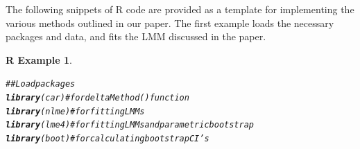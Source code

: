 \documentclass{article}\usepackage[]{graphicx}\usepackage[]{color}
\makeatletter
\newcommand{\hlcom}[1]{\textcolor[rgb]{0.678,0.584,0.686}{\textit{#1}}}%
\newcommand{\hlstd}[1]{\textcolor[rgb]{0.345,0.345,0.345}{#1}}%
\newcommand{\hlkwd}[1]{\textcolor[rgb]{0.737,0.353,0.396}{\textbf{#1}}}%
\newenvironment{kframe}{%
 \def\at@end@of@kframe{}%
 \ifinner\ifhmode%
  \def\at@end@of@kframe{\end{minipage}}%
  \begin{minipage}{\columnwidth}%
 \fi\fi%
 \def\FrameCommand##1{\hskip\@totalleftmargin \hskip-\fboxsep
 \colorbox{shadecolor}{##1}\hskip-\fboxsep
     \hskip-\linewidth \hskip-\@totalleftmargin \hskip\columnwidth}%
 \MakeFramed {\advance\hsize-\width
   \@totalleftmargin\z@ \linewidth\hsize
   \@setminipage}}%
 {\par\unskip\endMakeFramed%
 \at@end@of@kframe}
\newenvironment{knitrout}{}{} %
\newcommand{\proglang}[1]{\textsf{#1}}
\newtheorem{rexample}{R Example}%
\makeatother
\begin{document}
The following snippets of \proglang{R} code are provided as a template for implementing the various methods outlined in our paper. The first example loads the necessary packages and data, and fits the LMM discussed in the paper.
\begin{knitrout}
\color{fgcolor}\begin{kframe}
\begin{rexample}\label{example-1}\hfill{}\begin{alltt}
\hlcom{## Load packages}
\hlkwd{library}\hlstd{(car)}  \hlcom{# for deltaMethod() function}
\hlkwd{library}\hlstd{(nlme)}  \hlcom{# for fitting LMMs}
\hlkwd{library}\hlstd{(lme4)}  \hlcom{# for fitting LMMs and parametric bootstrap}
\hlkwd{library}\hlstd{(boot)}  \hlcom{# for calculating bootstrap CI's}



\end{alltt}
\end{rexample}
\end{kframe}
\end{knitrout}
\end{document}
